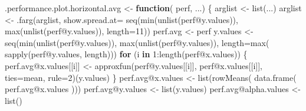 \documentclass[
  letterpaper,
  DIV=11,
  numbers=noendperiod]{scrartcl}
\newenvironment{Shaded}{\begin{snugshade}}{\end{snugshade}}
\newcommand{\AttributeTok}[1]{\textcolor[rgb]{0.40,0.45,0.13}{#1}}
\newcommand{\ControlFlowTok}[1]{\textcolor[rgb]{0.00,0.23,0.31}{\textbf{#1}}}
\newcommand{\DecValTok}[1]{\textcolor[rgb]{0.68,0.00,0.00}{#1}}
\newcommand{\FunctionTok}[1]{\textcolor[rgb]{0.28,0.35,0.67}{#1}}
\newcommand{\NormalTok}[1]{\textcolor[rgb]{0.00,0.23,0.31}{#1}}
\newcommand{\OtherTok}[1]{\textcolor[rgb]{0.00,0.23,0.31}{#1}}
\newcommand{\SpecialCharTok}[1]{\textcolor[rgb]{0.37,0.37,0.37}{#1}}
\begin{document}
\begin{Shaded}
\begin{Highlighting}[]
\NormalTok{.performance.plot.horizontal.avg }\OtherTok{\textless{}{-}} \ControlFlowTok{function}\NormalTok{( perf, ...) \{}
\NormalTok{    arglist }\OtherTok{\textless{}{-}} \FunctionTok{list}\NormalTok{(...)}
\NormalTok{    arglist }\OtherTok{\textless{}{-}} \FunctionTok{.farg}\NormalTok{(arglist,}
                     \AttributeTok{show.spread.at=} \FunctionTok{seq}\NormalTok{(}\FunctionTok{min}\NormalTok{(}\FunctionTok{unlist}\NormalTok{(perf}\SpecialCharTok{@}\NormalTok{y.values)),}
                       \FunctionTok{max}\NormalTok{(}\FunctionTok{unlist}\NormalTok{(perf}\SpecialCharTok{@}\NormalTok{y.values)),}
                       \AttributeTok{length=}\DecValTok{11}\NormalTok{))}
\NormalTok{    perf.avg }\OtherTok{\textless{}{-}}\NormalTok{ perf}
\NormalTok{    y.values }\OtherTok{\textless{}{-}} \FunctionTok{seq}\NormalTok{(}\FunctionTok{min}\NormalTok{(}\FunctionTok{unlist}\NormalTok{(perf}\SpecialCharTok{@}\NormalTok{y.values)), }\FunctionTok{max}\NormalTok{(}\FunctionTok{unlist}\NormalTok{(perf}\SpecialCharTok{@}\NormalTok{y.values)),}
                    \AttributeTok{length=}\FunctionTok{max}\NormalTok{( }\FunctionTok{sapply}\NormalTok{(perf}\SpecialCharTok{@}\NormalTok{y.values, length)))}
    \ControlFlowTok{for}\NormalTok{ (i }\ControlFlowTok{in} \DecValTok{1}\SpecialCharTok{:}\FunctionTok{length}\NormalTok{(perf}\SpecialCharTok{@}\NormalTok{x.values)) \{}
\NormalTok{        perf.avg}\SpecialCharTok{@}\NormalTok{x.values[[i]] }\OtherTok{\textless{}{-}} \FunctionTok{approxfun}\NormalTok{(perf}\SpecialCharTok{@}\NormalTok{y.values[[i]],}
\NormalTok{                                            perf}\SpecialCharTok{@}\NormalTok{x.values[[i]],}
                                            \AttributeTok{ties=}\NormalTok{mean, }\AttributeTok{rule=}\DecValTok{2}\NormalTok{)(y.values)}
\NormalTok{    \}}
\NormalTok{    perf.avg}\SpecialCharTok{@}\NormalTok{x.values }\OtherTok{\textless{}{-}} \FunctionTok{list}\NormalTok{(}\FunctionTok{rowMeans}\NormalTok{( }\FunctionTok{data.frame}\NormalTok{( perf.avg}\SpecialCharTok{@}\NormalTok{x.values )))}
\NormalTok{    perf.avg}\SpecialCharTok{@}\NormalTok{y.values }\OtherTok{\textless{}{-}} \FunctionTok{list}\NormalTok{(y.values)}
\NormalTok{    perf.avg}\SpecialCharTok{@}\NormalTok{alpha.values }\OtherTok{\textless{}{-}} \FunctionTok{list}\NormalTok{()}
    

\end{Highlighting}
\end{Shaded}
\end{document}
